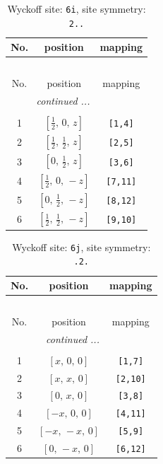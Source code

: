 \documentclass[fleqn,8pt]{jsarticle}
\begin{document}
\renewcommand{\arraystretch}{1.2}
\begin{longtable}{ccc}
\caption{Wyckoff site: {\tt 6i}, site symmetry: {\tt 2..}}
 \\
 \hline \hline
No. & position & mapping \\ \hline \endfirsthead

\multicolumn{2}{l}{\tablename\ \thetable{}} \\
 \hline \hline
No. & position & mapping \\ \hline \endhead

 \hline \hline
\multicolumn{2}{r}{\footnotesize\it continued ...} \\ \endfoot

 \hline \hline
\multicolumn{2}{r}{} \\ \endlastfoot

1 & $\left[ \frac{1}{2},\, 0,\, z \right]$ & {\tt [1,4]} \\ \hline
2 & $\left[ \frac{1}{2},\, \frac{1}{2},\, z \right]$ & {\tt [2,5]} \\ \hline
3 & $\left[ 0,\, \frac{1}{2},\, z \right]$ & {\tt [3,6]} \\ \hline
4 & $\left[ \frac{1}{2},\, 0,\, - z \right]$ & {\tt [7,11]} \\ \hline
5 & $\left[ 0,\, \frac{1}{2},\, - z \right]$ & {\tt [8,12]} \\ \hline
6 & $\left[ \frac{1}{2},\, \frac{1}{2},\, - z \right]$ & {\tt [9,10]} \\
\end{longtable}
\renewcommand{\arraystretch}{1.2}
\begin{longtable}{ccc}
\caption{Wyckoff site: {\tt 6j}, site symmetry: {\tt .2.}}
 \\
 \hline \hline
No. & position & mapping \\ \hline \endfirsthead

\multicolumn{2}{l}{\tablename\ \thetable{}} \\
 \hline \hline
No. & position & mapping \\ \hline \endhead

 \hline \hline
\multicolumn{2}{r}{\footnotesize\it continued ...} \\ \endfoot

 \hline \hline
\multicolumn{2}{r}{} \\ \endlastfoot

1 & $\left[ x,\, 0,\, 0 \right]$ & {\tt [1,7]} \\ \hline
2 & $\left[ x,\, x,\, 0 \right]$ & {\tt [2,10]} \\ \hline
3 & $\left[ 0,\, x,\, 0 \right]$ & {\tt [3,8]} \\ \hline
4 & $\left[ - x,\, 0,\, 0 \right]$ & {\tt [4,11]} \\ \hline
5 & $\left[ - x,\, - x,\, 0 \right]$ & {\tt [5,9]} \\ \hline
6 & $\left[ 0,\, - x,\, 0 \right]$ & {\tt [6,12]} \\
\end{longtable}
\end{document}

